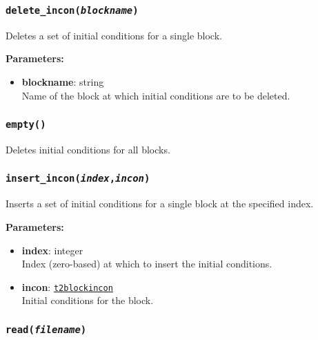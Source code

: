 \begin{snugshade}
\subsubsection{\texttt{delete\_incon(\emph{blockname})}}
\end{snugshade}
\label{sec:t2incon:delete_incon}

Deletes a set of initial conditions for a single block.

\textbf{Parameters:}
\begin{itemize}
\item \textbf{blockname}: string\\
  Name of the block at which initial conditions are to be deleted.
\end{itemize}

\begin{snugshade}
\subsubsection{\texttt{empty()}}
\end{snugshade}
\label{sec:t2incon:empty}

Deletes initial conditions for all blocks.

\begin{snugshade}
\subsubsection{\texttt{insert\_incon(\emph{index},\emph{incon})}}
\end{snugshade}
\label{sec:t2incon:insert_incon}

Inserts a set of initial conditions for a single block at the specified index.

\textbf{Parameters:}
\begin{itemize}
\item \textbf{index}: integer\\
  Index (zero-based) at which to insert the initial conditions.
\item \textbf{incon}: \hyperref[t2blockincons]{\texttt{t2blockincon}}\\
  Initial conditions for the block.
\end{itemize}

\begin{snugshade}
\subsubsection{\texttt{read(\emph{filename})}}
\end{snugshade}
\label{sec:t2incon:read}

